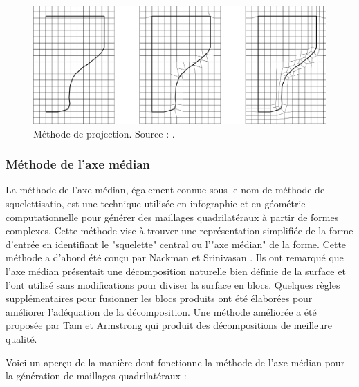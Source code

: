  \begin{figure}[!h]
    \centering
    \includegraphics[scale=0.4]{images/superpo_grid_2.png}
    \caption{Méthode de projection. Source : \cite{schneiders1996grid}.}
    \label{fig:superpo_grid_2}
\end{figure}

\subsubsection{Méthode de l'axe médian}

La méthode de l'axe médian, également connue sous le nom de méthode de squelettisatio, est une technique utilisée en infographie et en géométrie computationnelle pour générer des maillages quadrilatéraux à partir de formes complexes. Cette méthode vise à trouver une représentation simplifiée de la forme d'entrée en identifiant le "squelette" central ou l'"axe médian" de la forme. Cette méthode a d'abord été conçu par Nackman et Srinivasan \cite{nackman1989method}. Ils ont remarqué que l'axe médian présentait une décomposition naturelle bien définie de la surface et l'ont utilisé sans modifications pour diviser la surface en blocs. Quelques règles supplémentaires pour fusionner les blocs produits ont été élaborées pour améliorer l'adéquation de la décomposition. Une méthode améliorée a été proposée par Tam et Armstrong \cite{tam19912d} qui produit des décompositions de meilleure qualité.

Voici un aperçu de la manière dont fonctionne la méthode de l'axe médian pour la génération de maillages quadrilatéraux :\\

